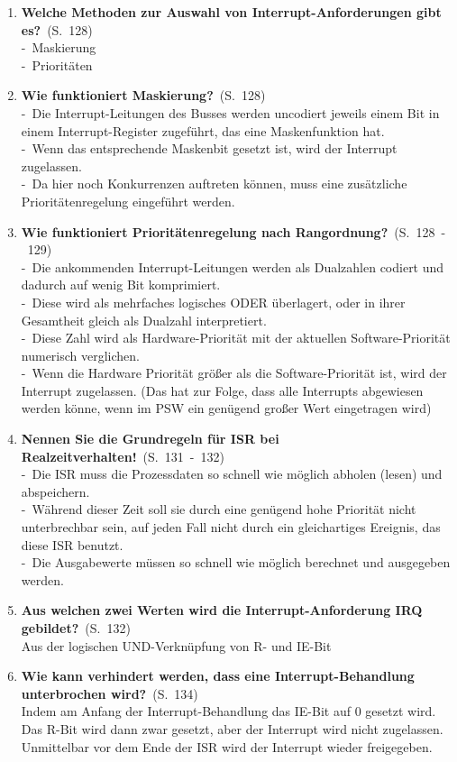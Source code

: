 \documentclass[a4paper,12pt]{article}
\newcommand{\question}[3]{\pagebreak[3]\item {\textbf{#1?}}\ (S.\ #2)#3}
\newcommand{\statement}[3]{\pagebreak[3]\item {\textbf{#1!}}\ (S.\ #2)#3}
\newcommand{\catchword}[1]{\\-\ #1}
\newcommand{\normaltext}[1]{\\#1}
\newcommand{\page}[1]{#1}
\newcommand{\pages}[2]{#1\ -\ #2}
\begin{document}
\begin{enumerate}
  \question{Welche Methoden zur Auswahl von Interrupt-Anforderungen gibt es}{\page{128}}
  {
    \catchword{Maskierung}
    \catchword{Prioritäten}
  }

  \question{Wie funktioniert Maskierung}{\page{128}}
  {
    \catchword{Die Interrupt-Leitungen des Busses werden uncodiert jeweils einem Bit in einem 
               Interrupt-Register zugeführt, das eine Maskenfunktion hat.}
    \catchword{Wenn das entsprechende Maskenbit gesetzt ist, wird der Interrupt zugelassen.}
    \catchword{Da hier noch Konkurrenzen auftreten können, muss eine zusätzliche Prioritätenregelung 
               eingeführt werden.}
  }

   \question{Wie funktioniert Prioritätenregelung nach Rangordnung}{\pages{128}{129}}
  {
    \catchword{Die ankommenden Interrupt-Leitungen werden als Dualzahlen codiert und dadurch auf wenig 
               Bit komprimiert.}
    \catchword{Diese wird als mehrfaches logisches ODER überlagert, oder in ihrer Gesamtheit gleich 
               als Dualzahl interpretiert.}
    \catchword{Diese Zahl wird als Hardware-Priorität mit der aktuellen Software-Priorität numerisch 
               verglichen.}
    \catchword{Wenn die Hardware Priorität größer als die Software-Priorität ist, wird der Interrupt
               zugelassen. (Das hat zur Folge, dass alle Interrupts abgewiesen werden könne, wenn
               im PSW ein genügend großer Wert eingetragen wird)}
  }

  \statement{Nennen Sie die Grundregeln für ISR bei Realzeitverhalten}{\pages{131}{132}}
  {
    \catchword{Die ISR muss die Prozessdaten so schnell wie möglich abholen (lesen) und abspeichern.}
    \catchword{Während dieser Zeit soll sie durch eine genügend hohe Priorität nicht unterbrechbar sein, 
               auf jeden Fall nicht durch ein gleichartiges Ereignis, das diese ISR benutzt.}
    \catchword{Die Ausgabewerte müssen so schnell wie möglich berechnet und ausgegeben werden.}
  }

  \question{Aus welchen zwei Werten wird die Interrupt-Anforderung IRQ gebildet}{\page{132}}
  {
    \normaltext{Aus der logischen UND-Verknüpfung von R- und IE-Bit}
  }

  \question{Wie kann verhindert werden, dass eine Interrupt-Behandlung unterbrochen wird}{\page{134}}
  {
    \normaltext{Indem am Anfang der Interrupt-Behandlung das IE-Bit auf 0 gesetzt wird.
                Das R-Bit wird dann zwar gesetzt, aber der Interrupt wird nicht zugelassen.
                Unmittelbar vor dem Ende der ISR wird der Interrupt wieder freigegeben.}
  }


\end{enumerate}
\end{document}
